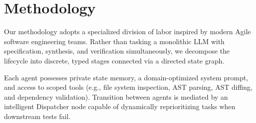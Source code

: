 \section{Methodology}
Our methodology adopts a specialized division of labor inspired by modern Agile software engineering teams. Rather than tasking a monolithic LLM with specification, synthesis, and verification simultaneously, we decompose the lifecycle into discrete, typed stages connected via a directed state graph.

Each agent possesses private state memory, a domain-optimized system prompt, and access to scoped tools (e.g., file system inspection, AST parsing, AST diffing, and dependency validation). Transition between agents is mediated by an intelligent Dispatcher node capable of dynamically reprioritizing tasks when downstream tests fail.
